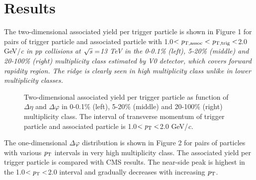 
\section {Results}

The two-dimensional associated yield per trigger particle is shown in Figure 1 for pairs of trigger particle and associated particle with 1.0$<\it{p}_{\rm{T, assoc}}<\it{p}_{\rm{T, trig}}<$2.0 GeV/\it{c}\rm{} in pp collisions at $\sqrt{\it{s}} = $\unit{13} {\rm{}TeV} in the 0-0.1\% (left), 5-20\% (middle) and 20-100\% (right) multiplicity class estimated by V0 detector, which covers forward rapidity region. The ridge is clearly seen in high multiplicity class unlike in lower multiplicity classes.


\begin{figure}
	\centering
	\caption{ Two-dimensional associated yield per trigger particle as function of $\Delta\eta$ and $\Delta\varphi$ in 0-0.1\% (left), 5-20\% (middle) and 20-100\% (right) multiplicity class. The interval of transverse momentum of trigger particle and associated particle is 1.0$<\it{p}_{\rm{T}}<$2.0 GeV/\it{c}\rm{}. }

\end{figure}

The one-dimensional $\Delta\varphi$ distribution is shown in Figure 2 for pairs of particles with various $\it{p}_{\rm{T}}$ intervals in very high multiplicity class. The associated yield per trigger particle is compared with CMS results. The near-side peak is highest in the 1.0$<\it{p}_{\rm{T}}<$2.0 interval and gradually decreases with increasing $\it{p}_{\rm{T}}$.


